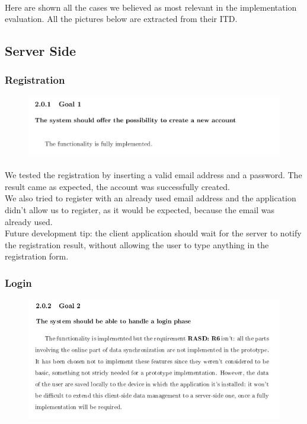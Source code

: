 \documentclass{article}
\begin{document}
		\paragraph{}Here are shown all the cases we believed as most relevant in the implementation evaluation. All the pictures below are extracted from their ITD.   
		\subsection{Server Side}
			\subsubsection{Registration}
			\begin{figure}[H]
			\includegraphics[width=\linewidth]{Images/Goals/Goal_1.png}
			\label{fig:G1}
			\end{figure}
			\paragraph{}We tested the registration by inserting a valid email address and a password. The result came as expected, the account was successfully created.\\
We also tried to register with an already used email address and the application didn’t allow us to register, as it would be expected, because the email was already used.\\
Future development tip: the client application should wait for the server to notify the registration result, without allowing the user to type anything in the registration form.
\newpage
			\subsubsection{Login}
			\begin{figure}[H]
			\includegraphics[width=\linewidth]{Images/Goals/Goal_2.jpg}
			\label{fig:G2}
			\end{figure}
\end{document}
